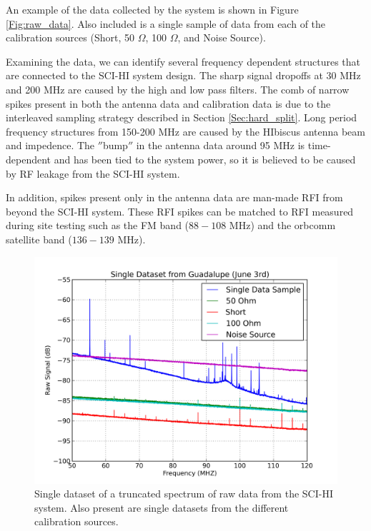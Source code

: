 An example of the data collected by the system is shown in Figure \ref{Fig:raw_data}. Also included is a single sample of data from each of the calibration sources (Short, 50 $\Omega$, 100 $\Omega$, and Noise Source). 

Examining the data, we can identify several frequency dependent structures that are connected to the SCI-HI system design. The sharp signal dropoffs at 30 MHz and 200 MHz are caused by the high and low pass filters. The comb of narrow spikes present in both the antenna data and calibration data is due to the interleaved sampling strategy described in Section \ref{Sec:hard_split}. Long period frequency structures from 150-200 MHz are caused by the HIbiscus antenna beam and impedence. The $''$bump$''$ in the antenna data around 95 MHz is time-dependent and has been tied to the system power, so it is believed to be caused by RF leakage from the SCI-HI system. 

In addition, spikes present only in the antenna data are man-made RFI from beyond the SCI-HI system. These RFI spikes can be matched to RFI measured during site testing such as the FM band ($88-108$ MHz) and the orbcomm satellite band ($136-139$ MHz). 

\begin{figure}[htb]
\begin{center}
\includegraphics[width=0.9\linewidth]{Data_analysis/figures/single_raw_trunc_guad_june03.png}
\caption{Single dataset of a truncated spectrum of raw data from the SCI-HI system. Also present are single datasets from the different calibration sources.}
\label{Fig:raw_data_trunc}
\end{center}
\end{figure}

